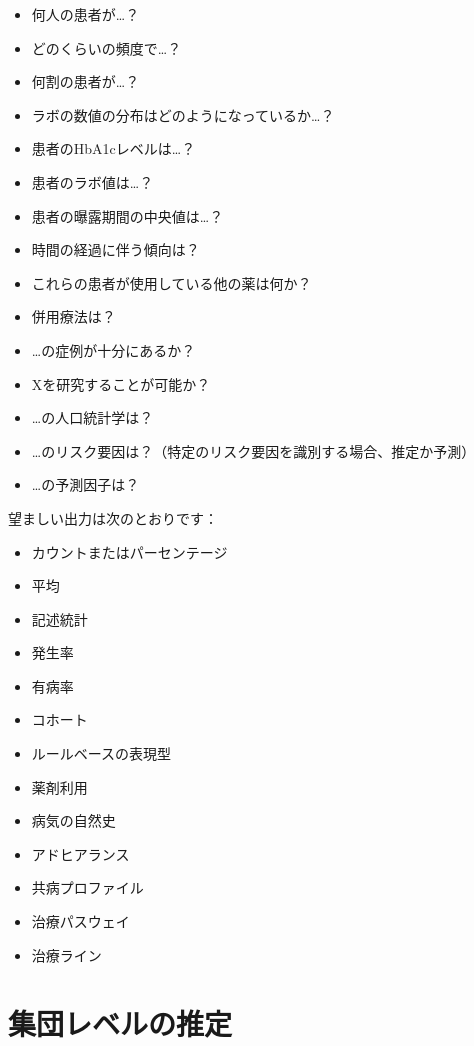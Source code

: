 \documentclass[
  11pt]{book}
\providecommand{\tightlist}{%
  \setlength{\itemsep}{0pt}\setlength{\parskip}{0pt}}
\theoremstyle{definition}
\theoremstyle{definition}
\theoremstyle{definition}
\theoremstyle{definition}
\theoremstyle{remark}
\begin{document}
\begin{itemize}
\tightlist
\item
  何人の患者が\ldots？
\item
  どのくらいの頻度で\ldots？
\item
  何割の患者が\ldots？
\item
  ラボの数値の分布はどのようになっているか\ldots？
\item
  患者のHbA1cレベルは\ldots？
\item
  患者のラボ値は\ldots？
\item
  患者の曝露期間の中央値は\ldots？
\item
  時間の経過に伴う傾向は？
\item
  これらの患者が使用している他の薬は何か？
\item
  併用療法は？
\item
  \ldots の症例が十分にあるか？
\item
  Xを研究することが可能か？
\item
  \ldots の人口統計学は？
\item
  \ldots のリスク要因は？（特定のリスク要因を識別する場合、推定か予測）
\item
  \ldots の予測因子は？
\end{itemize}

望ましい出力は次のとおりです：

\begin{itemize}
\tightlist
\item
  カウントまたはパーセンテージ
\item
  平均
\item
  記述統計
\item
  発生率
\item
  有病率
\item
  コホート
\item
  ルールベースの表現型
\item
  薬剤利用
\item
  病気の自然史
\item
  アドヒアランス
\item
  共病プロファイル
\item
  治療パスウェイ
\item
  治療ライン
\end{itemize}

\section{集団レベルの推定}\label{ux96c6ux56e3ux30ecux30d9ux30ebux306eux63a8ux5b9a}
\end{document}
